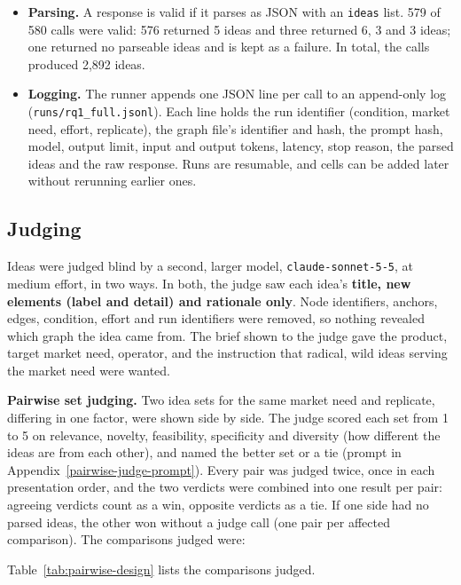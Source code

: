 \begin{itemize}
\tightlist
\item
  \textbf{Parsing.} A response is valid if it parses as JSON with an \texttt{ideas} list. 579 of 580 calls were valid: 576 returned 5 ideas and three returned 6, 3 and 3 ideas; one returned no parseable ideas and is kept as a failure. In total, the calls produced 2,892 ideas.
\item
  \textbf{Logging.} The runner appends one JSON line per call to an append-only log (\texttt{runs/rq1\_full.jsonl}). Each line holds the run identifier (condition, market need, effort, replicate), the graph file's identifier and hash, the prompt hash, model, output limit, input and output tokens, latency, stop reason, the parsed ideas and the raw response. Runs are resumable, and cells can be added later without rerunning earlier ones.
\end{itemize}

\hypertarget{judging}{%
\subsection{Judging}\label{judging}}

Ideas were judged blind by a second, larger model, \texttt{claude-sonnet-5-5}, at medium effort, in two ways. In both, the judge saw each idea's \textbf{title, new elements (label and detail) and rationale only}. Node identifiers, anchors, edges, condition, effort and run identifiers were removed, so nothing revealed which graph the idea came from. The brief shown to the judge gave the product, target market need, operator, and the instruction that radical, wild ideas serving the market need were wanted.

\textbf{Pairwise set judging.} Two idea sets for the same market need and replicate, differing in one factor, were shown side by side. The judge scored each set from 1 to 5 on relevance, novelty, feasibility, specificity and diversity (how different the ideas are from each other), and named the better set or a tie (prompt in Appendix~\ref{pairwise-judge-prompt}). Every pair was judged twice, once in each presentation order, and the two verdicts were combined into one result per pair: agreeing verdicts count as a win, opposite verdicts as a tie. If one side had no parsed ideas, the other won without a judge call (one pair per affected comparison). The comparisons judged were:

Table~\ref{tab:pairwise-design} lists the comparisons judged.

